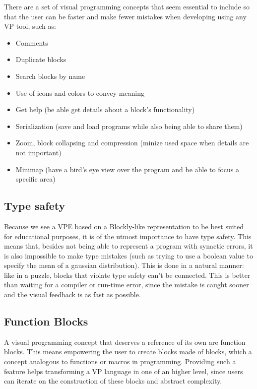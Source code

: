 \documentclass[9pt,a4paper]{extarticle}
\begin{document}
\begin{multicols}{2}
There are a set of visual programming concepts that seem essential to include
so that the user can be faster and make fewer mistakes when developing using
any VP tool, such as:

\begin{itemize}
  \item Comments
  \item Duplicate blocks
  \item Search blocks by name
  \item Use of icons and colors to convey meaning
  \item Get help (be able get details about a block's functionality)
  \item Serialization (save and load programs while also being able to share them)
  \item Zoom, block collapsing and compression (minize used space when details are not
  important)
  \item Minimap (have a bird's eye view over the program and be able to
  focus a specific area)
\end{itemize}

\subsection{Type safety}

Because we see a VPE based on a Blockly-like representation to be best suited for
educational purposes, it is of the utmost importance to have type safety. This
means that, besides not being able to represent a program with synactic errors,
it is also impossible to make type mistakes (such as trying to use a boolean value
to specify the mean of a gaussian distribution).
This is done in a natural manner: like in a puzzle, blocks that violate type
safety can't be connected. This is better than waiting for a compiler or run-time
error, since the mistake is caught sooner and the visual feedback is as fast as
possible.

\subsection{Function Blocks}

A visual programming concept that deserves a reference of its own are function blocks.
This means empowering the user to create blocks made of blocks, which a concept
analogous to functions or macros in programming. Providing such a feature helps
transforming a VP language in one of an higher level, since users can iterate
on the construction of these blocks and abstract complexity.


\end{multicols}
\end{document}
